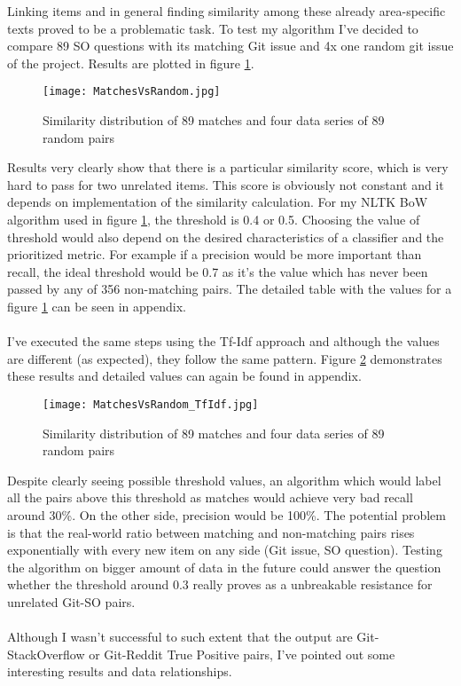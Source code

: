 Linking items and in general finding similarity among these already area-specific texts proved to be a problematic task. To test my algorithm I've decided to compare 89 SO questions with its matching Git issue and 4x one random git issue of the project. Results are plotted in figure \ref{fig:MatchesVsRandom}.\\

\begin{figure}[H]%
    \centering
	\texttt{[image: MatchesVsRandom.jpg]}
    \caption{Similarity distribution of 89 matches and four data series of 89 random pairs}%
    \label{fig:MatchesVsRandom}%
\end{figure}

Results very clearly show that there is a particular similarity score, which is very hard to pass for two unrelated items. This score is obviously not constant and it depends on implementation of the similarity calculation. For my NLTK BoW algorithm used in figure \ref{fig:MatchesVsRandom}, the threshold is 0.4 or 0.5. Choosing the value of threshold would also depend on the  desired characteristics of a classifier and the prioritized metric. For example if a precision would be more important than recall, the ideal threshold would be 0.7 as it's the value which has never been passed by any of 356 non-matching pairs. The detailed table with the values for a figure \ref{fig:MatchesVsRandom} can be seen in appendix.\\
\\
I've executed the same steps using the Tf-Idf approach and although the values are different (as expected), they follow the same pattern. Figure \ref{fig:MatchesVsRandom_TfIdf} demonstrates these results and detailed values can again be found in appendix.

\begin{figure}[H]%
    \centering
	\texttt{[image: MatchesVsRandom\_TfIdf.jpg]}
    \caption{Similarity distribution of 89 matches and four data series of 89 random pairs}%
    \label{fig:MatchesVsRandom_TfIdf}%
\end{figure}

Despite clearly seeing possible threshold values, an algorithm which would label all the pairs above this threshold as matches would achieve very bad recall around 30\%. On the other side, precision would be 100\%. The potential problem is that the real-world ratio between matching and non-matching pairs rises exponentially with every new item on any side (Git issue, SO question). Testing the algorithm on bigger amount of data in the future could answer the question whether the threshold around 0.3 really proves as a unbreakable resistance for unrelated Git-SO pairs.\\
\\
Although I wasn't successful to such extent that the output are Git-StackOverflow or Git-Reddit True Positive pairs, I've pointed out some interesting results and data relationships.

